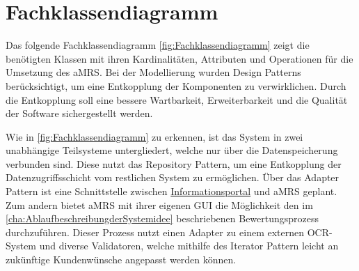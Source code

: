 \section{Fachklassendiagramm}

\noindent Das folgende Fachklassendiagramm \autoref{fig:Fachklassendiagramm} zeigt die benötigten Klassen mit ihren
Kardinalitäten, Attributen und Operationen für die Umsetzung des \ac{aMRS}. Bei der Modellierung wurden Design Patterns
berücksichtigt, um eine Entkopplung der Komponenten zu verwirklichen. Durch die Entkopplung soll eine bessere
Wartbarkeit, Erweiterbarkeit und die Qualität der Software sichergestellt werden. \newline

\noindent Wie in \autoref{fig:Fachklassendiagramm} zu erkennen, ist das System in zwei unabhängige Teilsysteme
untergliedert, welche nur über die Datenspeicherung verbunden sind. Diese nutzt das Repository Pattern, um eine
Entkopplung der Datenzugriffsschicht vom restlichen System zu ermöglichen. Über das Adapter Pattern ist eine
Schnittstelle zwischen \hyperref[gls:informationsportal]{Informationsportal} und \ac{aMRS} geplant. Zum andern bietet \ac{aMRS} mit ihrer eigenen GUI die
Möglichkeit den im \autoref{cha:AblaufbeschreibungderSystemidee} beschriebenen Bewertungsprozess durchzuführen. Dieser Prozess nutzt einen Adapter
zu einem externen OCR-System und diverse Validatoren, welche mithilfe des Iterator Pattern leicht an zukünftige
Kundenwünsche angepasst werden können.

\newpage

